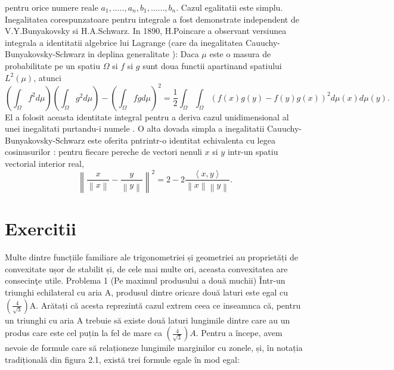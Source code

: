 \documentclass[a4paper,12pt,oneside]{report}
\begin{document}
pentru orice numere reale \(a_{1},.....,a_{n}, b_{1},......, b_{n}\). Cazul egalitatii este simplu. Inegalitatea corespunzatoare pentru integrale a fost demonstrate independent de V.Y.Bunyakovsky si H.A.Schwarz. 
	In 1890, H.Poincare a observant versiunea integrala a identitatii algebrice lui Lagrange (care da inegalitatea Cauuchy-Bunyakovsky-Schwarz in deplina generalitate ): Daca \(\mu\) este o masura de probabilitate pe un spatiu \(\Omega\) si \(f\) si \(g\) sunt doua functii apartinand spatiului \(L^{2}\left ( \mu  \right )\), atunci 
\begin{displaymath}
  \left (\int_{\Omega}f^{2}d\mu \right )\left (\int_{\Omega}g^{2}d\mu \right ) - \left (\int_{\Omega}fgd\mu \right )^{2} = \frac{1}{2}\int_{\Omega}\int_{\Omega}\left ( f\left ( x \right )g\left ( y \right ) - f\left ( y \right )g\left ( x \right )\right )^{2}d\mu \left ( x \right )d\mu \left ( y \right ).
\end{displaymath}
	El a folosit aceasta identitate integral pentru a deriva cazul unidimensional al unei inegalitati purtandu-i numele . O alta dovada simpla a inegalitatii Cauuchy-Bunyakovsky-Schwarz este oferita pntrintr-o identitat echivalenta cu legea cosinusurilor : pentru fiecare pereche de vectori nenuli \(x\) si \(y\) intr-un spatiu vectorial interior real, 
\begin{displaymath}
  \left \| \frac{x}{\left \| x \right \|} - \frac{y}{\left \| y \right \|}\right \|^{2} = 2 - 2\frac{\left \langle x , y \right \rangle}{\left \| x \right \|\left \| y \right \|}. 
\end{displaymath}



%
%
%
%


\chapter{Exercitii}

Multe dintre funcțiile familiare ale trigonometriei și geometriei au proprietăți de convexitate ușor de stabilit și, de cele mai multe ori, aceasta convexitatea are consecinţe utile.
Problema 1 (Pe maximul produsului a două muchii)
Într-un triunghi echilateral cu aria A, produsul dintre oricare două laturi este egal cu \(\left (\frac{4}{\sqrt{3}}  \right )\)A. Arătați că acesta reprezintă cazul extrem ceea ce inseamnca că, pentru un triunghi cu aria A trebuie să existe două laturi lungimile dintre care au un produs care este cel puțin la fel de mare ca \(\left (\frac{4}{\sqrt{3}}  \right )A\).
	Pentru a începe, avem nevoie de formule care să relaționeze lungimile marginilor cu zonele, și, în notația tradițională din figura 2.1, există trei formule egale în mod egal:
\end{document}
